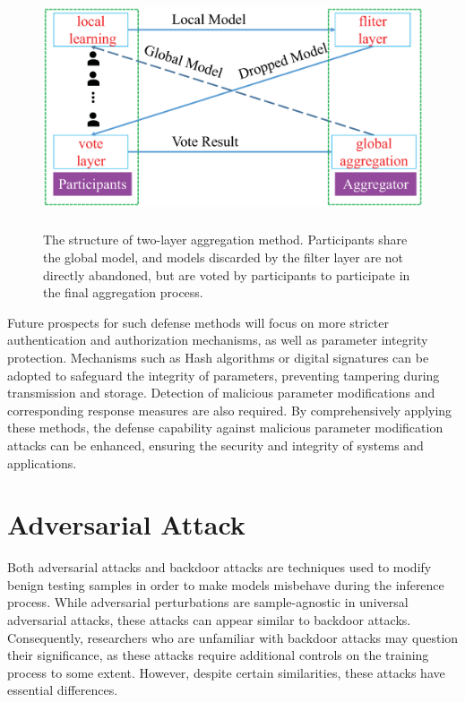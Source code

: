 \documentclass[pdflatex,sn-mathphys-num]{sn-jnl}%
\theoremstyle{thmstyleone}%
\theoremstyle{thmstyletwo}%
\theoremstyle{thmstylethree}%
\begin{document}
\begin{figure}[h]
	\centering
	\includegraphics[width=1.0\linewidth,height=2.8in]{output/fig19.eps}
	\caption{The structure of two-layer aggregation method. Participants
		share the global model, and models discarded by the filter layer are
		not directly abandoned, but are voted by participants to participate
		in the final aggregation process.}
	\label{fig19}
\end{figure}


Future prospects for such defense methods will
focus on more stricter authentication and authorization
mechanisms, as well as parameter integrity protection.
Mechanisms such as Hash algorithms or digital signatures
can be adopted to safeguard the integrity of parameters,
preventing tampering during transmission and storage.
Detection of malicious parameter modifications and
corresponding response measures are also required.
By comprehensively applying these methods, the defense capability
against malicious parameter modification attacks can be
enhanced, ensuring the security and integrity of systems
and applications.


\section{Adversarial Attack}
Both adversarial attacks and backdoor attacks are
techniques used to modify benign testing samples in order
to make models misbehave during the inference process.
While adversarial perturbations are sample-agnostic in
universal adversarial attacks, these attacks can appear
similar to backdoor attacks. Consequently, researchers
who are unfamiliar with backdoor attacks may question
their significance, as these attacks require additional
controls on the training process to some extent. However,
despite certain similarities, these attacks have essential
differences.
\end{document}
